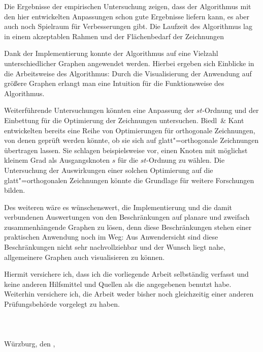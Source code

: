 \documentclass[a4paper]{scrreprt}
\theoremstyle{definition}
\begin{document}
Die Ergebnisse der empirischen Untersuchung zeigen, dass der Algorithmus mit den hier entwickelten Anpassungen schon gute Ergebnisse liefern kann, es aber auch noch Spielraum für Verbesserungen gibt. Die Laufzeit des Algorithmus lag in einem akzeptablen Rahmen und der Flächenbedarf der Zeichnungen 

Dank der Implementierung konnte der Algorithmus auf eine Vielzahl unterschiedlicher Graphen angewendet werden. Hierbei ergeben sich Einblicke in die Arbeitsweise des Algorithmus: Durch die Visualisierung der Anwendung auf größere Graphen erlangt man eine Intuition für die Funktionsweise des Algorithmus.

Weiterführende Untersuchungen könnten eine Anpassung der $st$-Ordnung und der Einbettung für die Optimierung der Zeichnungen untersuchen. Biedl~\& Kant ~\cite{biedl+kant-98} entwickelten bereits eine Reihe von Optimierungen für orthogonale Zeichnungen, von denen geprüft werden könnte, ob sie sich auf glatt"=orthogonale Zeichnungen übertragen lassen. Sie schlagen beispielsweise vor, einen Knoten mit möglichst kleinem Grad als Ausgangsknoten $s$ für die $st$-Ordnung zu wählen. Die Untersuchung der Auswirkungen einer solchen Optimierung auf die glatt"=orthogonalen Zeichnungen könnte die Grundlage für weitere Forschungen bilden.

Des weiteren wäre es wünschenswert, die Implementierung und die damit verbundenen Auswertungen von den Beschränkungen auf planare und zweifach zusammenhängende Graphen zu lösen, denn diese Beschränkungen stehen einer praktischen Anwendung noch im Weg: Aus Anwendersicht sind diese Beschränkungen nicht sehr nachvollziehbar und der Wunsch liegt nahe, allgemeinere Graphen auch visualisieren zu können.





\newpage

Hiermit versichere ich, dass ich die vorliegende Arbeit selbständig verfasst und keine
anderen Hilfsmittel und Quellen als die angegebenen benutzt habe. Weiterhin versichere
ich, die Arbeit weder bisher noch gleichzeitig einer anderen Prüfungsbehörde vorgelegt
zu haben.
\\ \\ \\ \\
Würzburg, den \makebox[3cm]{\hrulefill},  \hspace{.5cm} \makebox[7cm]{\hrulefill}\\
\end{document}
